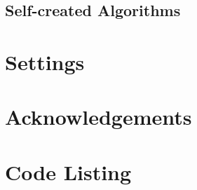 \subsection{Self-created Algorithms}

\section{Settings}

\section{Acknowledgements}

\section{Code Listing}

